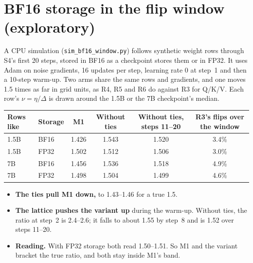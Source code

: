\documentclass[11pt]{article}
\begin{document}
\section{BF16 storage in the flip window (exploratory)}\label{sec:sim}
A CPU simulation (\texttt{sim\_bf16\_window.py}) follows synthetic weight rows through S4's first 20 steps, stored in BF16 as a checkpoint stores them or in FP32. It uses Adam on noise gradients, 16 updates per step, learning rate 0 at step~1 and then a 10-step warm-up. Two arms share the same rows and gradients, and one moves 1.5 times as far in grid units, as R4, R5 and R6 do against R3 for Q/K/V. Each row's $\nu=\eta/\Delta$ is drawn around the 1.5B or the 7B checkpoint's median.
\begin{center}\small
\begin{tabular}{@{}l l c c c c@{}}
\toprule
Rows like & Storage & M1 & Without ties & Without ties, steps 11--20 & R3's flips over the window\\
\midrule
1.5B & BF16 & 1.426 & 1.543 & 1.520 & 3.4\%\\
1.5B & FP32 & 1.502 & 1.512 & 1.506 & 3.0\%\\
7B & BF16 & 1.456 & 1.536 & 1.518 & 4.9\%\\
7B & FP32 & 1.498 & 1.504 & 1.499 & 4.6\%\\
\bottomrule
\end{tabular}
\end{center}
\begin{itemize}
\item \textbf{The ties pull M1 down,} to 1.43--1.46 for a true 1.5.
\item \textbf{The lattice pushes the variant up} during the warm-up. Without ties, the ratio at step~2 is 2.4--2.6; it falls to about 1.55 by step~8 and is 1.52 over steps 11--20.
\item \textbf{Reading.} With FP32 storage both read 1.50--1.51. So M1 and the variant bracket the true ratio, and both stay inside M1's band.
\end{itemize}

\end{document}
